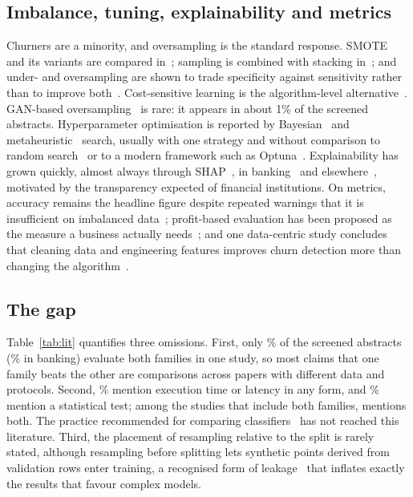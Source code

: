 \documentclass[conference]{IEEEtran}
\begin{document}
\subsection{Imbalance, tuning, explainability and metrics}
Churners are a minority, and oversampling is the standard response. SMOTE~\cite{chawla2002smote} and its variants are compared in~\cite{amin2016comparing,imani2024impact,mansoor2023banking,wu2016ecommerce}; sampling is combined with stacking in~\cite{de2022samplingbased}; and under- and oversampling are shown to trade specificity against sensitivity rather than to improve both~\cite{shumaly2020handling}. Cost-sensitive learning is the algorithm-level alternative~\cite{xiao2018costsensitive,zouaghia2026costsensitive}. GAN-based oversampling~\cite{xu2019ctgan} is rare: it appears in about 1\% of the screened abstracts. Hyperparameter optimisation is reported by Bayesian~\cite{kim2018bayesian,an2025novel} and metaheuristic~\cite{jovanovic2023credit,ponnusamy2023psosvm} search, usually with one strategy and without comparison to random search~\cite{bergstra2012random} or to a modern framework such as Optuna~\cite{akiba2019optuna}. Explainability has grown quickly, almost always through SHAP~\cite{lundberg2017unified}, in banking~\cite{raut2025bank,sarkar2026bank,zouaghia2026costsensitive,setiana2025improving} and elsewhere~\cite{leung2021explainable,ou2023interpretable,jm2025realtime}, motivated by the transparency expected of financial institutions. On metrics, accuracy remains the headline figure despite repeated warnings that it is insufficient on imbalanced data~\cite{raj2023machine,cao2019deep}; profit-based evaluation has been proposed as the measure a business actually needs~\cite{verbeke2012new,stripling2015profit,zhang2018novel}; and one data-centric study concludes that cleaning data and engineering features improves churn detection more than changing the algorithm~\cite{chowdhury2026datacentric}.

\subsection{The gap}
Table~\ref{tab:lit} quantifies three omissions. First, only \LitAllBoth\% of the screened abstracts (\LitBankBoth\% in banking) evaluate both families in one study, so most claims that one family beats the other are comparisons across papers with different data and protocols. Second, \LitAllTime\% mention execution time or latency in any form, and \LitAllStat\% mention a statistical test; among the \LitBothN{} studies that include both families, \LitBothTimeStatN{} mentions both. The practice recommended for comparing classifiers~\cite{demsar2006statistical} has not reached this literature. Third, the placement of resampling relative to the split is rarely stated, although resampling before splitting lets synthetic points derived from validation rows enter training, a recognised form of leakage~\cite{kaufman2012leakage} that inflates exactly the results that favour complex models.
\end{document}
